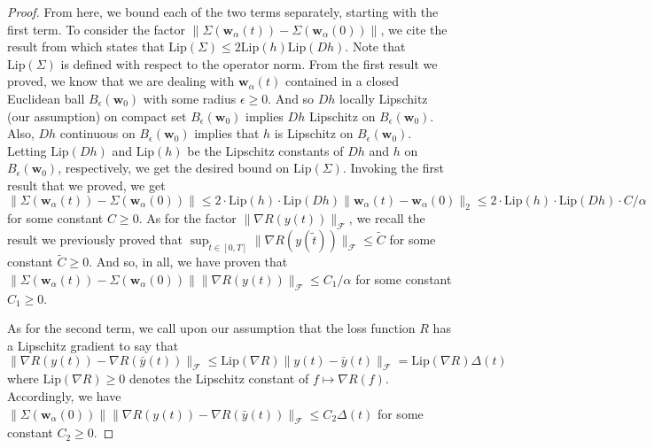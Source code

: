 \documentclass{article}
\begin{document}
\begin{proof}
From here, we bound each of the two terms separately, starting with the first term. To consider the factor $\|\Sigma(\boldsymbol{w}_{\alpha}(t)) - \Sigma(\boldsymbol{w}_{\alpha}(0))\|$, we cite the result from \cite{chizat2018lazy} which states that $\text{Lip}(\Sigma) \leq 2 \text{Lip}(h) \text{Lip}(Dh)$. Note that $\text{Lip}(\Sigma)$ is defined with respect to the operator norm. From the first result we proved, we know that we are dealing with $\boldsymbol{w}_{\alpha}(t)$ contained in a closed Euclidean ball $B_{\epsilon}(\boldsymbol{w}_0)$ with some radius $\epsilon \geq 0$. And so $Dh$ locally Lipschitz (our assumption) on compact set $B_{\epsilon}(\boldsymbol{w}_0)$ implies $Dh$ Lipschitz on $B_{\epsilon}(\boldsymbol{w}_0)$. Also, $Dh$ continuous on $B_{\epsilon}(\boldsymbol{w}_0)$ implies that $h$ is Lipschitz on $B_{\epsilon}(\boldsymbol{w}_0)$. Letting $\text{Lip}(Dh)$ and $\text{Lip}(h)$ be the Lipschitz constants of $Dh$ and $h$ on $B_{\epsilon}(\boldsymbol{w}_0)$, respectively, we get the desired bound on $\text{Lip}(\Sigma)$. Invoking the first result that we proved, we get $\|\Sigma(\boldsymbol{w}_{\alpha}(t)) - \Sigma(\boldsymbol{w}_{\alpha}(0))\| \leq 2 \cdot \text{Lip}(h) \cdot \text{Lip}(Dh) \|\boldsymbol{w}_{\alpha}(t) - \boldsymbol{w}_{\alpha}(0) \|_2 \leq 2 \cdot \text{Lip}(h) \cdot \text{Lip}(Dh) \cdot C /\alpha$ for some constant $C \geq 0$. As for the factor $\| \nabla R(y(t))\|_{\mathcal{F}}$, we recall the result we previously proved that $\sup_{\tilde{t} \in [0, T]} \| \nabla R(y(\tilde{t}))\|_{\mathcal{F}} \leq \tilde{C}$ for some constant $\tilde{C} \geq 0$. And so, in all, we have proven that $\|\Sigma(\boldsymbol{w}_{\alpha}(t)) - \Sigma(\boldsymbol{w}_{\alpha}(0))\| \| \nabla R(y(t))\|_{\mathcal{F}} \leq C_1/\alpha$ for some constant $C_1 \geq 0$.

As for the second term, we call upon our assumption that the loss function $R$ has a Lipschitz gradient to say that $\| \nabla R(y(t)) - \nabla R(\bar{y}(t))\|_{\mathcal{F}} \leq \text{Lip}(\nabla R) \| y(t) -  \bar{y}(t) \|_{\mathcal{F}} = \text{Lip}(\nabla R)\Delta(t)$ where $\text{Lip}(\nabla R) \geq 0$ denotes the Lipschitz constant of $f \mapsto \nabla R(f)$. Accordingly, we have $\| \Sigma(\boldsymbol{w}_{\alpha}(0)) \| \| \nabla R(y(t)) - \nabla R(\bar{y}(t))\|_{\mathcal{F}} \leq C_2 \Delta(t)$ for some constant $C_2 \geq 0$.


\end{proof}
\end{document}
